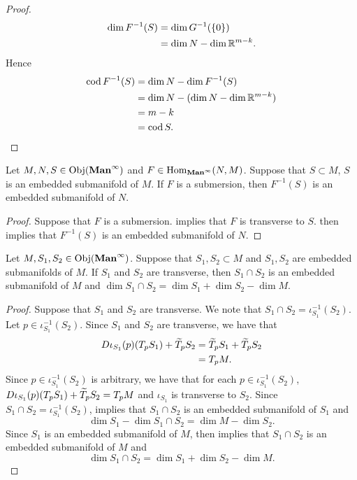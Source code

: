 \documentclass{book}
\begin{document}
\begin{proof}
		\begin{align*}
			\dim F^{-1}(S) 
			& = \dim G^{-1}(\{0\}) \\
			& = \dim N - \dim  \mathbb{R}^{m-k}.
		\end{align*}
		Hence
		\begin{align*}
			\operatorname{cod} F^{-1}(S)
			& = \dim N - \dim F^{-1}(S) \\
			& = \dim N - (\dim N - \dim \mathbb{R}^{m-k}) \\
			& = m - k \\
			& = \operatorname{cod} S.
		\end{align*}
	\end{proof}

	\begin{ex} 
		Let $M, N, S \in \operatorname{Obj}(\operatorname*{\text{\textbf{Man}}^{\infty}})$ and $F \in \operatorname{Hom}_{\operatorname*{\text{\textbf{Man}}^{\infty}}}(N, M)$. Suppose that $S \subset M$, $S$ is an embedded submanifold of $M$. If $F$ is a submersion, then $F^{-1}(S)$ is an embedded submanifold of $N$.
	\end{ex}

	\begin{proof}
		Suppose that $F$ is a submersion.  implies that $F$ is transverse to $S$.  then implies that $F^{-1}(S)$ is an embedded submanifold of $N$.
	\end{proof}

	\begin{ex} 
		Let $M, S_1, S_2 \in \operatorname{Obj}(\operatorname*{\text{\textbf{Man}}^{\infty}})$. Suppose that $S_1, S_2 \subset M$ and $S_1, S_2$ are embedded submanifolds of $M$. If $S_1$ and $S_2$ are transverse, then $S_1 \cap S_2$ is an embedded submanifold of $M$ and $\dim S_1 \cap S_2 = \dim S_1 + \dim S_2 - \dim M$. 
	\end{ex}

	\begin{proof}
		Suppose that $S_1$ and $S_2$ are transverse. We note that $S_1 \cap S_2 = \iota_{S_1}^{-1}(S_2)$. Let $p \in \iota_{S_1}^{-1}(S_2)$. Since $S_1$ and $S_2$ are transverse, we have that
		\begin{align*}
			D\iota_{S_1}(p)(T_p S_1) + \widetilde{T}_pS_2
			& = \widetilde{T}_p S_1 + \widetilde{T}_p S_2 \\
			& = T_pM.
		\end{align*} 
		Since $p \in \iota_{S_1}^{-1}(S_2)$ is arbitrary, we have that for each $p \in \iota_{S_1}^{-1}(S_2)$, $D\iota_{S_1}(p)(T_p S_1) + \widetilde{T}_pS_2 = T_pM$ and $\iota_{S_1}$ is transverse to $S_2$. Since $S_1 \cap S_2 = \iota_{S_1}^{-1}(S_2)$,  implies that $S_1 \cap S_2$ is an embedded submanifold of $S_1$ and 
		$$\dim S_1 - \dim S_1 \cap S_2 = \dim M - \dim S_2.$$ 
		Since $S_1$ is an embedded submanifold of $M$,   then implies that $S_1 \cap S_2$ is an embedded submanifold of $M$ and 
		$$\dim S_1 \cap S_2 = \dim S_1 + \dim S_2 - \dim M.$$
	\end{proof}
\end{document}
